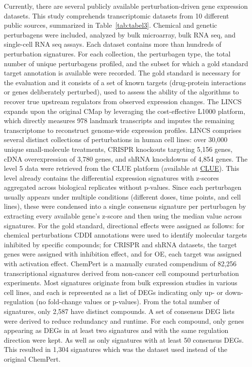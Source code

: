 Currently, there are several publicly available perturbation-driven gene expression datasets. This study comprehends transcriptomic datasets from 10 different public sources, summarized in Table~\ref{tab:tabel3}. Chemical and genetic perturbagens were included, analyzed by bulk microarray, bulk RNA seq, and single-cell RNA seq assays. Each dataset contains more than hundreds of perturbation signatures. For each collection, the perturbagen type, the total number of unique perturbagens profiled, and the subset for which a gold standard target annotation is available were recorded. The gold standard is necessary for the evaluation and it consists of a set of known targets (drug-protein interactions or genes deliberately perturbed), used to assess the ability of the algorithms to recover true upstream regulators from observed expression changes. 
The LINCS expands upon the original CMap by leveraging the cost-effective L1000 platform, which directly measures 978 landmark transcripts and imputes the remaining transcriptome to reconstruct genome-wide expression profiles. LINCS comprises several distinct collections of perturbations in human cell lines: over 30,000 unique small-molecule treatments, CRISPR knockouts targeting 5,156 genes, cDNA overexpression of 3,780 genes, and shRNA knockdowns of 4,854 genes. The level 5 data were retrieved from the CLUE platform (available at \href{https://clue.io/data/CMap2020#LINCS2020}{CLUE}). This level already contains the differential expression signatures with z-scores aggregated across biological replicates without p-values. Since each perturbagen usually appears under multiple conditions (different doses, time points, and cell lines), these were condensed into a single consensus signature per perturbagen by extracting every available gene's z-score and then using the median value across signatures. For the gold standard, directional effects were assigned as follows: for chemical perturbations CDDI annotations were used to identify molecular targets inhibited by specific compounds; for CRISPR and shRNA datasets, the target genes were assigned with inhibition effect, and for OE, each target was assigned with activation effect.
ChemPert is a manually curated compendium of 82,256 transcriptional signatures derived from non-cancer cell compound perturbation experiments. Most signatures originate from bulk expression studies in various cell lines, and each is represented as a list of DEGs indicating only up- or down-regulation (no fold-change values or p-values). From the total number of signatures, only 2,587 have distinct compounds. A set of consensus DEG lists were derived to reduce redundancy and runtime. For each compound, only genes appearing as DEGs in at least two signatures and with the same regulation direction were kept. As well as only signatures with at least 50 consensus DEGs. This resulted in 1,304 signatures which was the dataset used instead of the original ChemPert.
